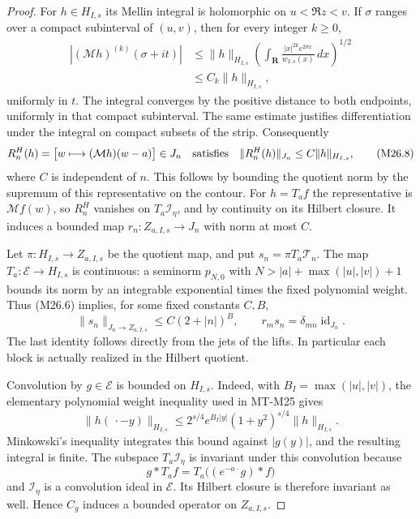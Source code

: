 \begin{proof}
For $h\in H_{I,s}$ its Mellin integral is holomorphic on
$u<\Re z<v$. If $\sigma$ ranges over a compact subinterval
of $(u,v)$, then for every integer $k\ge0$,
\[
 \begin{split}
 |(\mathcal Mh)^{(k)}(\sigma+it)|
 &\le\|h\|_{H_{I,s}}
   \left(\int_{\mathbf R}
     \frac{|x|^{2k}e^{2\sigma x}}{w_{I,s}(x)}\,dx\right)^{1/2}\\
 &\le C_k\|h\|_{H_{I,s}},
 \end{split}                                                    \tag{M26.7}
\]
uniformly in $t$. The integral converges by the positive
distance to both endpoints, uniformly in that compact
subinterval. The same estimate justifies differentiation
under the integral on compact subsets of the strip.
Consequently
\[
 R_n^H(h)=\bigl[w\longmapsto(\mathcal Mh)(w-a)\bigr]\in J_n
 \quad\hbox{satisfies}\quad
       \|R_n^H(h)\|_{J_n}\le C\|h\|_{H_{I,s}},
                                                               \tag{M26.8}
\]
where $C$ is independent of $n$. This follows by bounding
the quotient norm by the supremum of this representative
on the contour. For $h=T_af$ the representative is
$\mathcal Mf(w)$, so $R_n^H$ vanishes on $T_a\mathcal I_\eta$,
and by continuity on its Hilbert closure. It induces a
bounded map $r_n:Z_{a,I,s}\to J_n$ with norm at most $C$.

Let $\pi:H_{I,s}\to Z_{a,I,s}$ be the quotient map, and put
$s_n=\pi T_a\mathcal T_n$. The map $T_a:\mathcal E\to H_{I,s}$
is continuous: a seminorm $p_{N,0}$ with
$N>|a|+\max(|u|,|v|)+1$ bounds its norm by an integrable
exponential times the fixed polynomial weight. Thus (M26.6)
implies, for some fixed constants $C,B$,
\[
 \|s_n\|_{J_n\to Z_{a,I,s}}\le C(2+|n|)^B,
 \qquad r_m s_n=\delta_{mn}\operatorname{id}_{J_n}.
                                                               \tag{M26.9}
\]
The last identity follows directly from the jets of the
lifts. In particular each block is actually realized in
the Hilbert quotient.

Convolution by $g\in\mathcal E$ is bounded on $H_{I,s}$.
Indeed, with $B_I=\max(|u|,|v|)$, the elementary polynomial
weight inequality used in MT-M25 gives
\[
 \|h(\,\cdot-y)\|_{H_{I,s}}
 \le2^{s/4}e^{B_I|y|}(1+y^2)^{s/4}\|h\|_{H_{I,s}}.
                                                               \tag{M26.10}
\]
Minkowski's inequality integrates this bound against
$|g(y)|$, and the resulting integral is finite.
The subspace $T_a\mathcal I_\eta$ is invariant under this
convolution because
\[
           g*T_af=T_a\bigl((e^{-a\cdot}g)*f\bigr)
                                                               \tag{M26.11}
\]
and $\mathcal I_\eta$ is a convolution ideal in $\mathcal E$.
Its Hilbert closure is therefore invariant as well. Hence
$C_g$ induces a bounded operator on $Z_{a,I,s}$.


\end{proof}
